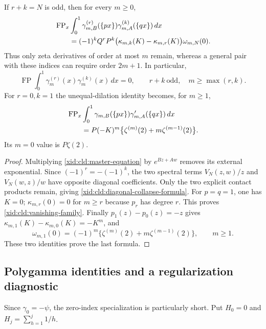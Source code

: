 \begin{corollary}
\label{xid:cld:diagonal-collapse}
If $r+k=N$ is odd, then for every $m\ge0$,
\begin{align}
 &\operatorname{FP}_x\int_0^1
   \gamma_{m,B}^{(r)}(\{px\})\gamma_{m,A}^{(k)}(\{qx\})\,dx\notag\\
 &\qquad=(-1)^kQ^rP^k
       \bigl(\kappa_{m,k}(K)-\kappa_{m,r}(K)\bigr)\omega_{m,N}(0).
 \label{xid:cld:diagonal-collapse-formula}
\end{align}
Thus only zeta derivatives of order at most $m$ remain, whereas a general
pair with these indices can require order $2m+1$.  In particular,
\begin{equation}
 \operatorname{FP}\int_0^1\gamma_m^{(r)}(x)\gamma_m^{(k)}(x)\,dx=0,
 \qquad r+k\ \text{odd},\quad m\ge\max(r,k).
 \label{xid:cld:vanishing-family}
\end{equation}
For $r=0,k=1$ the unequal-dilation identity becomes, for $m\ge1$,
\begin{align}
 &\operatorname{FP}_x\int_0^1
   \gamma_{m,B}(\{px\})\gamma_{m,A}'(\{qx\})\,dx\notag\\
 &\qquad=P(-K)^m\bigl\{\zeta^{(m)}(2)+m\zeta^{(m-1)}(2)\bigr\}.
 \label{xid:cld:diagonal-first-derivative}
\end{align}
Its $m=0$ value is $P\zeta(2)$.
\end{corollary}
\begin{proof}
Multiplying \eqref{xid:cld:master-equation} by $e^{Bz+Aw}$ removes its
external exponential.  Since $(-1)^r=-(-1)^k$, the two spectral terms
$V_N(z,w)/z$ and $V_N(w,z)/w$ have opposite diagonal coefficients.
Only the two explicit contact products remain, giving
\eqref{xid:cld:diagonal-collapse-formula}.  For $p=q=1$, one has $K=0$;
$\kappa_{m,r}(0)=0$ for $m\ge r$ because $p_r$ has degree $r$.
This proves \eqref{xid:cld:vanishing-family}.  Finally $p_1(z)-p_0(z)=-z$
gives $\kappa_{m,1}(K)-\kappa_{m,0}(K)=-K^m$, and
\[
 \omega_{m,1}(0)=(-1)^m
      \{\zeta^{(m)}(2)+m\zeta^{(m-1)}(2)\},\qquad m\ge1.
\]
These two identities prove the last formula.
\end{proof}

\subsection{Polygamma identities and a regularization diagnostic}

Since $\gamma_0=-\psi$, the zero-index specialization is particularly
short.  Put $H_0=0$ and $H_j=\sum_{h=1}^j1/h$.

